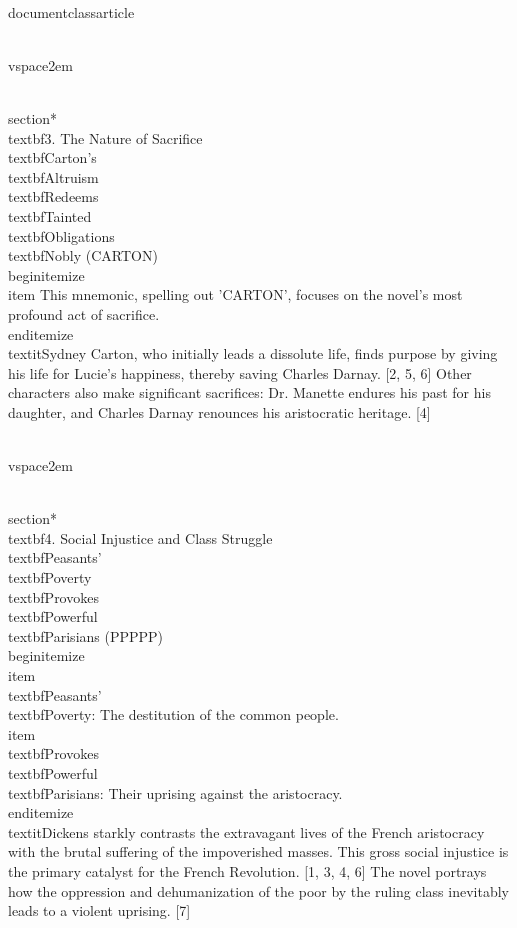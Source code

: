 \\documentclass{article}
\begin{document}
\\vspace{2em}

\\section*{\\textbf{3. The Nature of Sacrifice}}
\\textbf{C}arton's \\textbf{A}ltruism \\textbf{R}edeems \\textbf{T}ainted \\textbf{O}bligations \\textbf{N}obly (CARTON)
\\begin{itemize}
    \\item This mnemonic, spelling out 'CARTON', focuses on the novel's most profound act of sacrifice.
\\end{itemize}
\\textit{Sydney Carton, who initially leads a dissolute life, finds purpose by giving his life for Lucie's happiness, thereby saving Charles Darnay. [2, 5, 6] Other characters also make significant sacrifices: Dr. Manette endures his past for his daughter, and Charles Darnay renounces his aristocratic heritage. [4]}

\\vspace{2em}

\\section*{\\textbf{4. Social Injustice and Class Struggle}}
\\textbf{P}easants' \\textbf{P}overty \\textbf{P}rovokes \\textbf{P}owerful \\textbf{P}arisians (PPPPP)
\\begin{itemize}
    \\item \\textbf{P}easants' \\textbf{P}overty: The destitution of the common people.
    \\item \\textbf{P}rovokes \\textbf{P}owerful \\textbf{P}arisians: Their uprising against the aristocracy.
\\end{itemize}
\\textit{Dickens starkly contrasts the extravagant lives of the French aristocracy with the brutal suffering of the impoverished masses. This gross social injustice is the primary catalyst for the French Revolution. [1, 3, 4, 6] The novel portrays how the oppression and dehumanization of the poor by the ruling class inevitably leads to a violent uprising. [7]}
\end{document}
